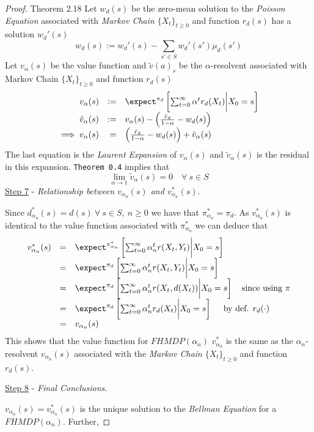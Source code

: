 \documentclass[11pt,a4paper]{article}
\begin{document}
\begin{proof}{Theorem 2.18}
    Let $w_d(s)$ be the zero-mean solution to the \textit{Poisson Equation} associated with \textit{Markov Chain} $\{X_t\}_{t\geq0}$ and function $r_d(s)$ has a solution $w_d'(s)$
    \[ w_d(s):=w_d'(s)-\sum_{s'\in S}w_d'(s')\mu_d(s') \]
    Let $v_\alpha(s)$ be the value function and $\tilde{v}(a)_s$ be the $\alpha$-resolvent associated with Markov Chain $\{X_t\}_{t\geq0}$ and function $r_d(s)$
    \[\begin{array}{rrl}
      v_\alpha(s)&:=&\expect^{\pi_d}\left[\sum_{t=0}^\infty\alpha^tr_d(X_t)\bigg|X_0=s\right]\\
      \tilde{v}_\alpha(s)&:=&v_\alpha(s)-\left(\frac{\bar{r}_d}{1-\alpha}-w_d(s)\right)\\
      \implies v_\alpha(s)&=&\left(\frac{\bar{r}_d}{1-\alpha}-w_d(s)\right)+\tilde{v}_\alpha(s)
    \end{array}\]
    The last equation is the \textit{Laurent Expansion} of $v_\alpha(s)$ and $\tilde{v}_\alpha(s)$ is the residual in this expansion.
    \texttt{Theorem 0.4} implies that
    \[ \lim_{\alpha\to1}\tilde{v}_\alpha(s)=0\quad\forall\ s\in S \]
    \underline{Step 7} - \textit{Relationship between $v_{\alpha_n}(s)$ and $v_{\alpha_n}^*(s)$}.
    \par Since $d_{\alpha_n}^*(s)=d(s)\ \forall\ s\in S,\ n\geq0$ we have that $\pi_{\alpha_n}^*=\pi_d$. As $v_{\alpha_n}^*(s)$ is identical to the value function associated with $\pi_{\alpha_n}^*$ we can deduce that
    \[\begin{array}{rcl}
      v_{\alpha_n}^*(s)&=&\expect^{\pi_{\alpha_n}^*}\left[\sum_{t=0}^\infty\alpha_n^tr(X_t,Y_t)\bigg|X_0=s\right]\\
      &=&\expect^{\pi_d}\left[\sum_{t=0}^\infty\alpha_n^tr(X_t,Y_t)\bigg|X_0=s\right]\\
      &=&\expect^{\pi_d}\left[\sum_{t=0}^\infty\alpha_n^tr(X_t,d(X_t))\bigg|X_0=s\right]\quad\text{since using }\pi\\
      &=&\expect^{\pi_d}\left[\sum_{t=0}^\infty\alpha_n^tr_d(X_t)\bigg|X_0=s\right]\quad\text{ by def. }r_d(\cdot)\\
      &=&v_{\alpha_n}(s)
    \end{array}\]
    This shows that the value function for $FHMDP(\alpha_n)$ $v_{\alpha_n}^*$ is the same as the $\alpha_n$-resolvent $v_{\alpha_n}(s)$ associated with the \textit{Markov Chain} $\{X_t\}_{t\geq0}$ and function $r_d(s)$.
    \par \underline{Step 8} - \textit{Final Conclusions}.
    \par $v_{\alpha_n}(s)=v_{\alpha_n}^*(s)$ is the unique solution to the \textit{Bellman Equation} for a $FHMDP(\alpha_n)$. Further,

\end{proof}
\end{document}
